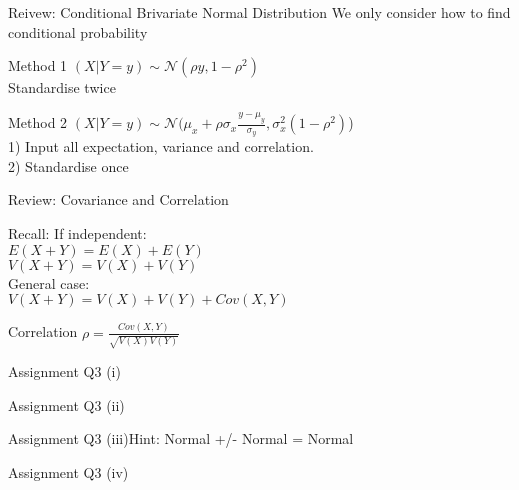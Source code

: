 \documentclass{beamer}
\begin{document}
\begin{frame}{Reivew: Conditional Brivariate Normal Distribution}
    We only consider how to find conditional probability
\begin{block}{Method 1}
    $(X|Y = y) \sim \mathcal{N}(\rho y, 1 - \rho ^2)$
    \\ Standardise twice
\end{block}
\begin{block}{Method 2}
    $(X|Y = y) \sim \mathcal{N}(\mu_x + \rho \sigma_x \frac{y-\mu_y}{\sigma_y}, \sigma_x ^2 (1-\rho ^2)$)
    \\1) Input all expectation, variance and correlation.
    \\2) Standardise once
\end{block}
\end{frame}
\begin{frame}{Review: Covariance and Correlation}
\begin{block}{Recall:}
If independent:
    \\$E(X+Y) = E(X) + E(Y)$
    \\$V(X+Y) = V(X) + V(Y)$
    \\General case:
    \\$V(X+Y) = V(X) + V(Y) + Cov(X, Y)$
\end{block}

\begin{block}{Correlation \rho}
    $\rho = \frac{Cov(X, Y)}{\sqrt{V(X)V(Y)}} $
\end{block}
    
\end{frame}

\begin{frame}{Assignment Q3 (i)}
\end{frame}

\begin{frame}{Assignment Q3 (ii)}
\end{frame}

\begin{frame}{Assignment Q3 (iii)}{Hint: Normal +/- Normal = Normal}
\end{frame}

\begin{frame}{Assignment Q3 (iv)}
\end{frame}
\end{document}
